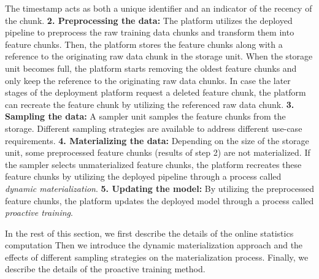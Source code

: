 The timestamp acts as both a unique identifier and an indicator of the recency of the chunk.\newline
\textbf{2. Preprocessing the data: } 
The platform utilizes the deployed pipeline to preprocess the raw training data chunks and transform them into feature chunks.
Then, the platform stores the feature chunks along with a reference to the originating raw data chunk in the storage unit.
When the storage unit becomes full, the platform starts removing the oldest feature chunks and only keep the reference to the originating raw data chunks.
In case the later stages of the deployment platform request a deleted feature chunk, the platform can recreate the feature chunk by utilizing the referenced raw data chunk. 
\newline
\textbf{3. Sampling the data: }
A sampler unit samples the feature chunks from the storage.
Different sampling strategies are available to address different use-case requirements.\newline
\textbf{4. Materializing the data: }
Depending on the size of the storage unit, some preprocessed feature chunks (results of step 2) are not materialized.
If the sampler selects unmaterialized feature chunks, the platform recreates these feature chunks by utilizing the deployed pipeline through a process called \textit{dynamic materialization}.\newline
\textbf{5. Updating the model: }
By utilizing the preprocessed feature chunks, the platform updates the deployed model through a process called \textit{proactive training}.\newline

In the rest of this section, we first describe the details of the online statistics computation 
Then we introduce the dynamic materialization approach and the effects of different sampling strategies on the materialization process.
Finally, we describe the details of the proactive training method.

